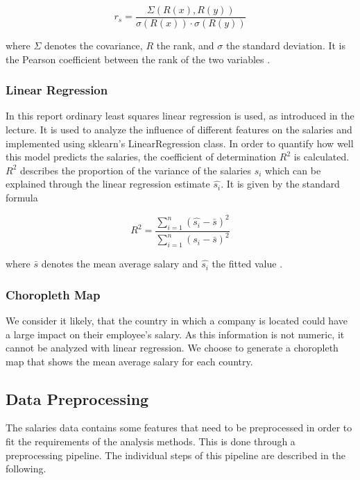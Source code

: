 \documentclass{article}
\begin{document}
\begin{equation}
    r_s = \frac{\Sigma(R(x), R(y))}{\sigma(R(x)) \cdot \sigma(R(y))}
\end{equation}

where $\Sigma$ denotes the covariance, $R$ the rank, and $\sigma$ the standard deviation. It is the Pearson coefficient between the rank of the two variables \cite{spearman1904proof}.

\subsubsection{Linear Regression}
In this report ordinary least squares linear regression is used, as introduced in the lecture. It is used to analyze the influence of different features on the salaries and implemented using sklearn's LinearRegression class. In order to quantify how well this model predicts the salaries, the coefficient of determination $R^2$ is calculated. $R^2$ describes the proportion of the variance of the salaries $s_i$ which can be explained through the linear regression estimate $\hat{s_i}$. It is given by the standard formula

\begin{equation}
    R^2 = \frac{\sum_{i=1}^{n} (\hat{s_i} - \bar{s})^2}{\sum_{i=1}^n ({s_i} - \bar{s})^2}
\end{equation}

where $\bar{s}$ denotes the mean average salary and $\hat{s_i}$ the fitted value \cite{coefficient2008}. 

\subsubsection{Choropleth Map} 
We consider it likely, that the country in which a company is located could have a large impact on their employee's salary. As this information is not numeric, it cannot be analyzed with linear regression. We choose to generate a choropleth map that shows the mean average salary for each country.

\subsection{Data Preprocessing}
The salaries data contains some features that need to be preprocessed in order to fit the requirements of the analysis methods. This is done through a preprocessing pipeline. The individual steps of this pipeline are described in the following.
\end{document}
